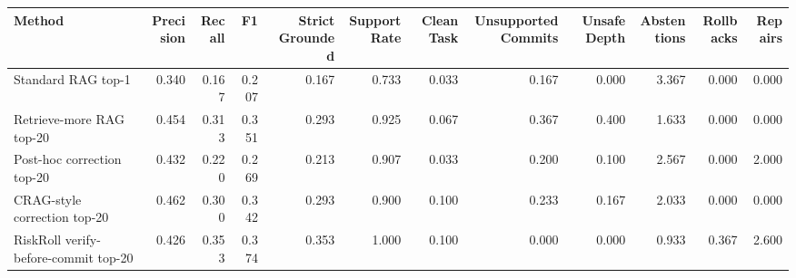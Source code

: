 \begin{tabular}{lrrrrrrrrrrr}
\toprule
Method & Precision & Recall & F1 & Strict Grounded & Support Rate & Clean Task & Unsupported Commits & Unsafe Depth & Abstentions & Rollbacks & Repairs \\
\midrule
Standard RAG top-1 & 0.340 & 0.167 & 0.207 & 0.167 & 0.733 & 0.033 & 0.167 & 0.000 & 3.367 & 0.000 & 0.000 \\
Retrieve-more RAG top-20 & 0.454 & 0.313 & 0.351 & 0.293 & 0.925 & 0.067 & 0.367 & 0.400 & 1.633 & 0.000 & 0.000 \\
Post-hoc correction top-20 & 0.432 & 0.220 & 0.269 & 0.213 & 0.907 & 0.033 & 0.200 & 0.100 & 2.567 & 0.000 & 2.000 \\
CRAG-style correction top-20 & 0.462 & 0.300 & 0.342 & 0.293 & 0.900 & 0.100 & 0.233 & 0.167 & 2.033 & 0.000 & 0.000 \\
RiskRoll verify-before-commit top-20 & 0.426 & 0.353 & 0.374 & 0.353 & 1.000 & 0.100 & 0.000 & 0.000 & 0.933 & 0.367 & 2.600 \\
\bottomrule
\end{tabular}
